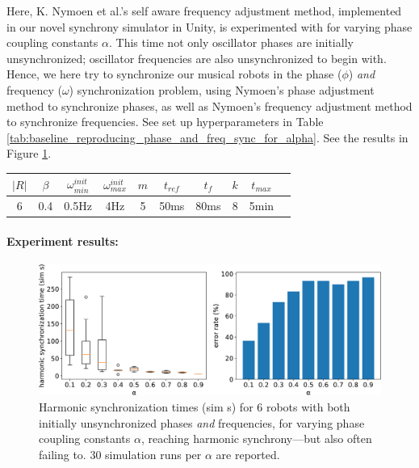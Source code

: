 			Here, K. Nymoen et al.'s self aware frequency adjustment method, implemented in our novel synchrony simulator in Unity, is experimented with for varying phase coupling constants $\alpha$. This time not only oscillator phases are initially unsynchronized; oscillator frequencies are also unsynchronized to begin with. Hence, we here try to synchronize our musical robots in the phase ($\phi$) \textit{and} frequency ($\omega$) synchronization problem, using Nymoen's phase adjustment method to synchronize phases, as well as Nymoen's frequency adjustment method to synchronize frequencies. See set up hyperparameters in Table \ref{tab:baseline_reproducing_phase_and_freq_sync_for_alpha}. See the results in Figure \ref{fig:baseline_reproducing_phase_and_freq_sync_for_alpha}.
			
			\begin{center}
			\begin{tabular}{ |c|c|c|c|c|c|c|c|c|c| } 
			\hline
			$|R|$ & $\beta$ & $\omega_{min}^{init}$ & $\omega_{max}^{init}$ & $m$ & $t_{ref}$ & $t_f$ & $k$ & $t_{max}$ \\
			\hline
			6 & 0.4 & 0.5Hz & 4Hz & 5 & 50ms & 80ms & 8 & 5min \\
			\hline
			\end{tabular}
			\label{tab:baseline_reproducing_phase_and_freq_sync_for_alpha}
			\end{center}
			
			\paragraph{Experiment results:\nl}
			
			\begin{figure}[ht!]
				\centering
				\includegraphics[width=\linewidth]{Assets/DocSegments/Chapters/ExperimentsAndResults/Figures/PerfScores/baseline_reproducing_phase_and_freq_sync_for_alpha.pdf}
				\caption{Harmonic synchronization times (sim s) for 6 robots with both initially unsynchronized phases \textit{and} frequencies, for varying phase coupling constants $\alpha$, reaching harmonic synchrony—but also often failing to. 30 simulation runs per $\alpha$ are reported.}
				\label{fig:baseline_reproducing_phase_and_freq_sync_for_alpha}
			\end{figure}
			
